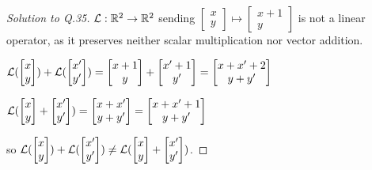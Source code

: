 \begin{proof}[Solution to Q.35]
  $\mathcal{L}: \mathbb{R}^2 \rightarrow \mathbb{R}^2$ sending $\begin{bmatrix} x \\y \end{bmatrix} \mapsto \begin{bmatrix} x + 1 \\ y \end{bmatrix}$ is not a linear operator, as it preserves neither scalar multiplication nor vector addition.

  $\mathcal{L}(\begin{bmatrix} x \\ y \end{bmatrix}) + \mathcal{L}(\begin{bmatrix} x' \\ y' \end{bmatrix}) = \begin{bmatrix} x+1 \\ y \end{bmatrix} + \begin{bmatrix} x'+1 \\ y' \end{bmatrix} = \begin{bmatrix} x+x' + 2 \\ y + y' \end{bmatrix}$

  $\mathcal{L}(\begin{bmatrix} x \\ y \end{bmatrix} + \begin{bmatrix} x' \\ y' \end{bmatrix}) = \begin{bmatrix} x+x' \\ y + y' \end{bmatrix} = \begin{bmatrix} x+x' + 1 \\ y + y' \end{bmatrix}$

  so $\mathcal{L}(\begin{bmatrix} x \\ y \end{bmatrix}) + \mathcal{L}(\begin{bmatrix} x' \\ y' \end{bmatrix}) \neq \mathcal{L}(\begin{bmatrix} x \\ y \end{bmatrix} + \begin{bmatrix} x' \\ y' \end{bmatrix})$.
\end{proof}

